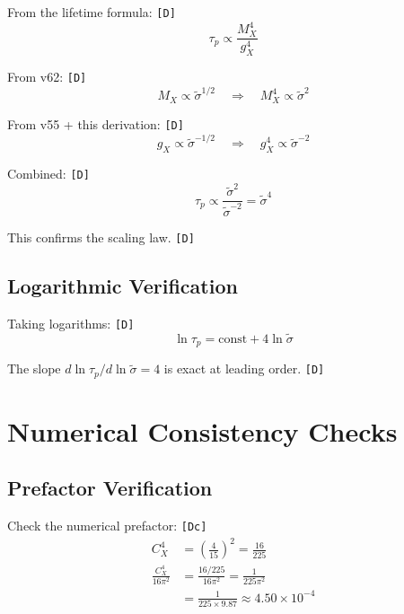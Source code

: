 \documentclass[11pt,a4paper]{article}
\newcommand{\tagD}{\textcolor{green!50!black}{\texttt{[D]}}}
\newcommand{\tagDc}{\textcolor{blue!70!black}{\texttt{[Dc]}}}
\theoremstyle{definition}
\begin{document}
From the lifetime formula: \tagD{}
\begin{equation}
\label{eq:app-power-1}
\tau_p \propto \frac{M_X^4}{g_X^4}
\end{equation}

From v62: \tagD{}
\begin{equation}
\label{eq:app-power-2}
M_X \propto \tilde{\sigma}^{1/2} \quad \Rightarrow \quad M_X^4 \propto \tilde{\sigma}^2
\end{equation}

From v55 + this derivation: \tagD{}
\begin{equation}
\label{eq:app-power-3}
g_X \propto \tilde{\sigma}^{-1/2} \quad \Rightarrow \quad g_X^4 \propto \tilde{\sigma}^{-2}
\end{equation}

Combined: \tagD{}
\begin{equation}
\label{eq:app-power-4}
\tau_p \propto \frac{\tilde{\sigma}^2}{\tilde{\sigma}^{-2}} = \tilde{\sigma}^4
\end{equation}

This confirms the scaling law. \tagD{}

\subsection{Logarithmic Verification}
\label{app:log-verify}

Taking logarithms: \tagD{}
\begin{equation}
\label{eq:app-log-verify}
\ln\tau_p = \text{const} + 4\ln\tilde{\sigma}
\end{equation}

The slope $d\ln\tau_p / d\ln\tilde{\sigma} = 4$ is exact at leading order. \tagD{}

\section{Numerical Consistency Checks}
\label{app:numerical-checks}

\subsection{Prefactor Verification}
\label{app:prefactor}

Check the numerical prefactor: \tagDc{}
\begin{align}
\label{eq:app-pf-1}
C_X^4 &= \left(\frac{4}{15}\right)^2 = \frac{16}{225} \\
\label{eq:app-pf-2}
\frac{C_X^4}{16\pi^2} &= \frac{16/225}{16\pi^2} = \frac{1}{225\pi^2} \\
\label{eq:app-pf-3}
&= \frac{1}{225 \times 9.87} \approx 4.50 \times 10^{-4}
\end{align}
\end{document}
